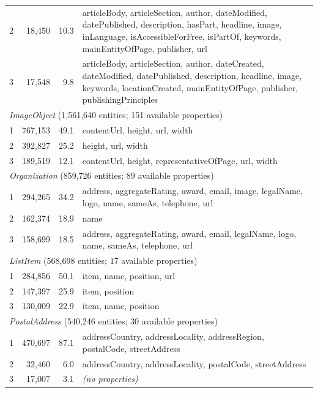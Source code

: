 \documentclass[11pt,a4paper]{article}
\begin{document}
\begin{longtable}{rrrp{9cm}}
2 & 18{,}450 & 10.3 & \scriptsize articleBody, articleSection, author, dateModified, datePublished, description, hasPart, headline, image, inLanguage, isAccessibleForFree, isPartOf, keywords, mainEntityOfPage, publisher, url \\[2pt]
3 & 17{,}548 &  9.8 & \scriptsize articleBody, articleSection, author, dateCreated, dateModified, datePublished, description, headline, image, keywords, locationCreated, mainEntityOfPage, publisher, publishingPrinciples \\[4pt]
%
\multicolumn{4}{l}{\textit{ImageObject} (1{,}561{,}640 entities; 151 available properties)} \\
\midrule
1 & 767{,}153 & 49.1 & \scriptsize contentUrl, height, url, width \\[2pt]
2 & 392{,}827 & 25.2 & \scriptsize height, url, width \\[2pt]
3 & 189{,}519 & 12.1 & \scriptsize contentUrl, height, representativeOfPage, url, width \\[4pt]
%
\multicolumn{4}{l}{\textit{Organization} (859{,}726 entities; 89 available properties)} \\
\midrule
1 & 294{,}265 & 34.2 & \scriptsize address, aggregateRating, award, email, image, legalName, logo, name, sameAs, telephone, url \\[2pt]
2 & 162{,}374 & 18.9 & \scriptsize name \\[2pt]
3 & 158{,}699 & 18.5 & \scriptsize address, aggregateRating, award, email, legalName, logo, name, sameAs, telephone, url \\[4pt]
%
\multicolumn{4}{l}{\textit{ListItem} (568{,}698 entities; 17 available properties)} \\
\midrule
1 & 284{,}856 & 50.1 & \scriptsize item, name, position, url \\[2pt]
2 & 147{,}397 & 25.9 & \scriptsize item, position \\[2pt]
3 & 130{,}009 & 22.9 & \scriptsize item, name, position \\[4pt]
%
\multicolumn{4}{l}{\textit{PostalAddress} (540{,}246 entities; 30 available properties)} \\
\midrule
1 & 470{,}697 & 87.1 & \scriptsize addressCountry, addressLocality, addressRegion, postalCode, streetAddress \\[2pt]
2 &  32{,}460 &  6.0 & \scriptsize addressCountry, addressLocality, postalCode, streetAddress \\[2pt]
3 &  17{,}007 &  3.1 & \scriptsize \textit{(no properties)} \\[4pt]

\end{longtable}
\end{document}
